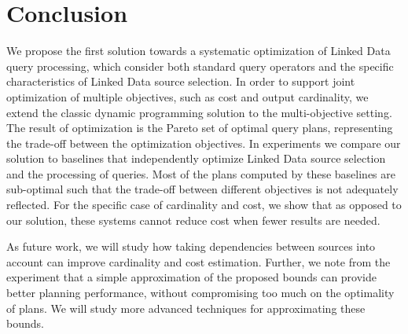 \section{Conclusion}
\label{sec:conclusion}

We propose the first solution towards a systematic optimization of
Linked Data query processing, which consider both standard query operators
and the specific characteristics of Linked Data source selection. In order to support joint optimization of multiple objectives, such as cost and output cardinality,
we extend the classic dynamic programming solution to the multi-objective setting. The result of optimization is the Pareto set of optimal query plans, representing the trade-off between the
optimization objectives. 
In experiments we compare our
solution to baselines that independently optimize Linked Data source selection and the processing of queries. Most of the plans computed by these baselines are sub-optimal such that the trade-off between different objectives is not adequately reflected. For the specific case of cardinality and cost, we show that as opposed to our solution, these systems cannot reduce cost when fewer results are needed. 

As future work, we will study how taking dependencies between sources into account can improve cardinality and
cost estimation. Further, we note from the experiment that a simple approximation of the proposed bounds can provide better planning performance, without compromising too much on the optimality of plans. We will study more advanced techniques for approximating these bounds. 

